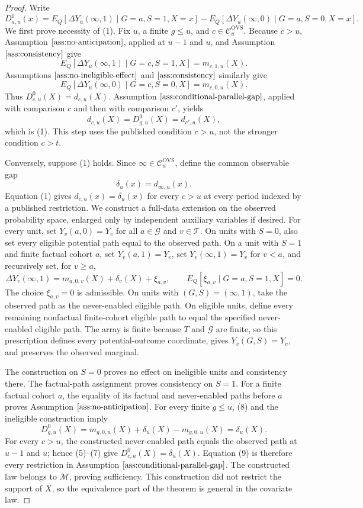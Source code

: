 \documentclass{article}
\begin{document}
\begin{proof}
Write
\[
D^0_{a,u}(x)=E_Q[\Delta Y_u(\infty,1)\mid G=a,S=1,X=x]
-E_Q[\Delta Y_u(\infty,0)\mid G=a,S=0,X=x].
\]
We first prove necessity of (1).  Fix \(u\), a finite \(g\le u\), and \(c\in\mathcal C_u^{\mathrm{OVS}}\).  Because \(c>u\), Assumption \(\ref{ass:no-anticipation}\), applied at \(u-1\) and \(u\), and Assumption \(\ref{ass:consistency}\) give
\[
E_Q[\Delta Y_u(\infty,1)\mid G=c,S=1,X]=m_{c,1,u}(X).
\tag{5}
\]
Assumptions \(\ref{ass:no-ineligible-effect}\) and \(\ref{ass:consistency}\) similarly give
\[
E_Q[\Delta Y_u(\infty,0)\mid G=c,S=0,X]=m_{c,0,u}(X).
\tag{6}
\]
Thus \(D^0_{c,u}(X)=d_{c,u}(X)\).  Assumption \(\ref{ass:conditional-parallel-gap}\), applied with comparison \(c\) and then with comparison \(c'\), yields
\[
d_{c,u}(X)=D^0_{g,u}(X)=d_{c',u}(X),
\]
which is (1).  This step uses the published condition \(c>u\), not the stronger condition \(c>t\).

Conversely, suppose (1) holds.  Since \(\infty\in\mathcal C_u^{\mathrm{OVS}}\), define the common observable gap
\[
\delta_u(x)=d_{\infty,u}(x).
\tag{7}
\]
Equation (1) gives \(d_{c,u}(x)=\delta_u(x)\) for every \(c>u\) at every period indexed by a published restriction.  We construct a full-data extension on the observed probability space, enlarged only by independent auxiliary variables if desired.  For every unit, set \(Y_v(a,0)=Y_v\) for all \(a\in\mathcal G\) and \(v\in\mathcal T\).  On units with \(S=0\), also set every eligible potential path equal to the observed path.  On a unit with \(S=1\) and finite factual cohort \(a\), set \(Y_v(a,1)=Y_v\), set \(Y_v(\infty,1)=Y_v\) for \(v<a\), and recursively set, for \(v\ge a\),
\[
\Delta Y_v(\infty,1)=m_{a,0,v}(X)+\delta_v(X)+\xi_{a,v},
\qquad
E_Q[\xi_{a,v}\mid G=a,S=1,X]=0.
\tag{8}
\]
The choice \(\xi_{a,v}=0\) is admissible.  On units with \((G,S)=(\infty,1)\), take the observed path as the never-enabled eligible path.  On eligible units, define every remaining nonfactual finite-cohort eligible path to equal the specified never-enabled eligible path.  The array is finite because \(T\) and \(\mathcal G\) are finite, so this prescription defines every potential-outcome coordinate, gives \(Y_v(G,S)=Y_v\), and preserves the observed marginal.

The construction on \(S=0\) proves no effect on ineligible units and consistency there.  The factual-path assignment proves consistency on \(S=1\).  For a finite factual cohort \(a\), the equality of its factual and never-enabled paths before \(a\) proves Assumption \(\ref{ass:no-anticipation}\).  For every finite \(g\le u\), (8) and the ineligible construction imply
\[
D^0_{g,u}(X)=m_{g,0,u}(X)+\delta_u(X)-m_{g,0,u}(X)=\delta_u(X).
\tag{9}
\]
For every \(c>u\), the constructed never-enabled path equals the observed path at \(u-1\) and \(u\); hence (5)--(7) give \(D^0_{c,u}(X)=\delta_u(X)\).  Equation (9) is therefore every restriction in Assumption \(\ref{ass:conditional-parallel-gap}\).  The constructed law belongs to \(\mathcal M\), proving sufficiency.  This construction did not restrict the support of \(X\), so the equivalence part of the theorem is general in the covariate law.


\end{proof}
\end{document}
